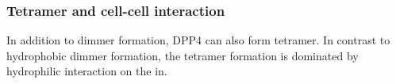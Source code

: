 \subsubsection{Tetramer and cell-cell interaction}

In addition to dimmer formation, DPP4 can also form tetramer. In contrast to hydrophobic dimmer formation, the tetramer formation is dominated by hydrophilic interaction on the in.~\cite{Engel_2003} 
